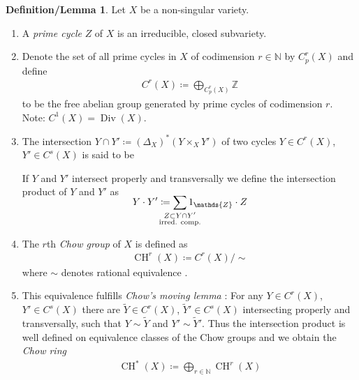 \documentclass[english,headsepline=0.25pt]{scrartcl}
\theoremstyle{definition}
\newtheorem{DefLem}[Def]{Definition/Lemma}
\theoremstyle{remark}
\newcommand*{\N}{\mathds{N}}
\newcommand*{\Z}{\mathds{Z}}
\DeclareMathOperator{\codim}{codim} %
\newcommand*{\intProd}[2]{{#1\cdot#2}} %
\newcommand*{\Diag}[1]{{\Delta_{#1}}} %
\DeclareMathOperator{\CH}{CH} %
\DeclareMathOperator{\Div}{Div} %
\begin{document}
\begin{DefLem}
  Let $X$ be a non-singular variety.
  \begin{enumerate}
  \item A \emph{prime cycle} $Z$ of $X$ is an irreducible, closed
    subvariety.
  \item Denote the set of all prime cycles in $X$ of codimension
    $r\in\N$ by $C_p^r(X)$ and define
    \begin{gather*}
      C^r(X) \coloneqq \bigoplus_{C_p^r(X)}\Z
    \end{gather*}
    to be the free abelian group generated by prime cycles of
    codimension $r$.
    Note: $C^1(X)=\Div(X)$.
  \item The intersection
    $Y\cap Y'\coloneqq (\Diag{X})^*(Y\times_X Y')$ of two cycles 
    $Y\in C^r(X)$, $Y'\in C^s(X)$ is said to be
    If $Y$ and $Y'$ intersect properly and transversally we define
    the intersection product of $Y$ and $Y'$ as
    \begin{gather*}
      \SwapAboveDisplaySkip
      \intProd{Y}{Y'} \coloneqq
      \sum_{\mathclap{
          \substack{Z\subset Y\cap Y'\\
            \text{irred. comp.}
          }}} 1_\Z\cdot Z
    \end{gather*}
  \item The $r$th \emph{Chow group} of $X$ is defined as
    \begin{gather*}
      \CH^r(X) \coloneqq C^r(X)/\sim
    \end{gather*}
    where $\sim$ denotes rational equivalence
    \cite[see][p.\,426]{hartshorne}.
  \item This equivalence fulfills \emph{Chow's moving lemma}
    \cite[][p.\,427]{hartshorne}:
    For any $Y\in C^r(X)$, $Y'\in C^s(X)$ there are
    $\widetilde Y\in C^r(X)$, $\widetilde Y'\in C^s(X)$ intersecting
    properly and transversally, such that $Y\sim\widetilde Y$ and
    $Y'\sim\widetilde Y'$.
    Thus the intersection product is well defined on equivalence
    classes of the Chow groups and we obtain the \emph{Chow ring}
    \begin{gather*}
      \CH^*(X) \coloneqq \bigoplus_{r\in\N} \CH^r(X)
    \end{gather*}
  \end{enumerate}
\end{DefLem}
\end{document}
